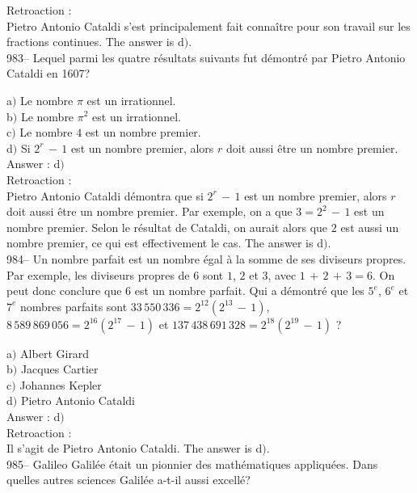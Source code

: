 ﻿\documentclass[letterpaper, 12pt]{article}
\begin{document}
Retroaction : \\
Pietro Antonio Cataldi s'est principalement fait conna\^itre pour son
travail sur les fractions continues. The answer is d$)$.\\

983-- Lequel parmi les quatre r\'esultats suivants fut d\'emontr\'e
par Pietro Antonio Cataldi en 1607?

a$)$ Le nombre $\pi$ est un irrationnel. \\
b$)$ Le nombre $\pi^2$ est un irrationnel. \\
c$)$ Le nombre $4$ est un nombre premier. \\
d$)$ Si $2^r\,-\,1$ est un nombre premier, alors $r$ doit aussi \^etre un
nombre premier.\\

Answer : d$)$\\

Retroaction : \\
Pietro Antonio Cataldi d\'emontra que si $2^r\,-\,1$ est un nombre
premier, alors $r$ doit aussi \^etre un nombre premier. Par exemple,
on a que $3=2^2\,-\,1$ est un nombre premier. Selon le r\'esultat de
Cataldi, on aurait alors que $2$ est aussi un nombre premier, ce qui
est effectivement le cas.
The answer is d$)$.\\

984-- Un nombre parfait est un nombre \'egal \`a la somme de ses
diviseurs propres. Par exemple, les diviseurs propres de $6$ sont
$1$, $2$ et $3$, avec $1\,+\,2\,+\,3=6$. On peut donc conclure que
$6$ est un nombre parfait. Qui a d\'emontr\'e que les $5^e$, $6^e$
et $7^e$ nombres parfaits sont $33\,550\,336=2^{12}(2^{13}\,-\,1)$,
$8\,589\,869\,056=2^{16}(2^{17}\,-\,1)$ et
$137\,438\,691\,328=2^{18}(2^{19}\,-\,1)$ ?

a$)$ Albert Girard\\
b$)$ Jacques Cartier \\
c$)$ Johannes Kepler \\
d$)$ Pietro Antonio Cataldi\\

Answer : d$)$\\

Retroaction : \\
Il s'agit de Pietro Antonio Cataldi. The answer is d$)$.\\

985-- Galileo Galil\'ee \'etait un pionnier des math\'ematiques
appliqu\'ees. Dans quelles autres sciences Galil\'ee a-t-il aussi
excell\'e?
\end{document}
